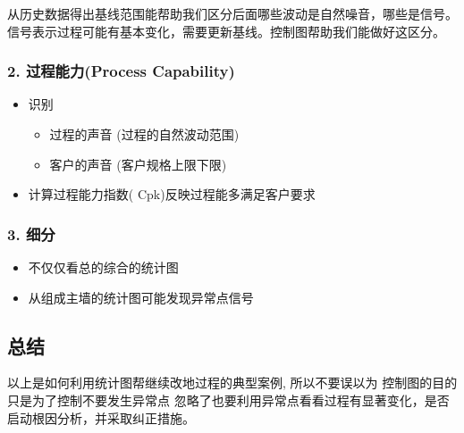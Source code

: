 从历史数据得出基线范围能帮助我们区分后面哪些波动是自然噪音，哪些是信号。
信号表示过程可能有基本变化，需要更新基线。控制图帮助我们能做好这区分。

\hypertarget{ux8fc7ux7a0bux80fdux529bprocess-capability}{%
\subsubsection{2. 过程能力(Process
Capability)}\label{ux8fc7ux7a0bux80fdux529bprocess-capability}}

\begin{itemize}
\tightlist
\item
  识别

  \begin{itemize}
  \tightlist
  \item
    过程的声音 (过程的自然波动范围)
  \item
    客户的声音 (客户规格上限下限)
  \end{itemize}
\item
  计算过程能力指数( Cpk)反映过程能多满足客户要求
\end{itemize}

\hypertarget{ux7ec6ux5206}{%
\subsubsection{3. 细分}\label{ux7ec6ux5206}}

\begin{itemize}
\tightlist
\item
  不仅仅看总的综合的统计图
\item
  从组成主墙的统计图可能发现异常点信号
\end{itemize}

\begin{description}
\item[]
\end{description}

\hypertarget{ux603bux7ed3}{%
\subsection{总结}\label{ux603bux7ed3}}

以上是如何利用统计图帮继续改地过程的典型案例, 所以不要误以为
控制图的目的只是为了控制不要发生异常点
忽略了也要利用异常点看看过程有显著变化，是否启动根因分析，并采取纠正措施。

